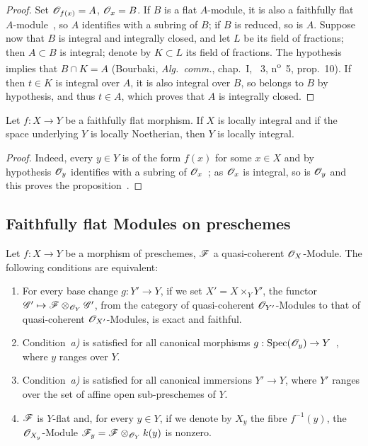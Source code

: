\begin{proof}
Set $\mathscr{O}_{f(x)}=A$, $\mathscr{O}_x=B$.
If $B$ is a flat $A$-module, it is also a faithfully flat $A$-module~, so $A$ identifies with a subring of $B$; if $B$ is reduced, so is $A$.
Suppose now that $B$ is integral and integrally closed, and let $L$ be its field of fractions; then $A\subset B$ is integral; denote by $K\subset L$ its field of fractions.
The hypothesis implies that $B\cap K=A$ (Bourbaki, \emph{Alg.~comm.}, chap.~I, \textsection~3, n\textsuperscript{o}~5, prop.~10).
If then $t\in K$ is integral over $A$, it is also integral over $B$, so belongs to $B$ by hypothesis, and thus $t\in A$, which proves that $A$ is integrally closed.
\end{proof}

\begin{proposition}[2.1.14]
\label{IV.2.1.14}
Let $f:X\to Y$ be a faithfully flat morphism. If $X$ is locally integral and if the space underlying $Y$ is locally Noetherian, then $Y$ is locally integral.
\end{proposition}

\begin{proof}
Indeed, every $y\in Y$ is of the form $f(x)$ for some $x\in X$ and by hypothesis $\mathscr{O}_y$ identifies with a subring of $\mathscr{O}_x$~; as $\mathscr{O}_x$ is integral, so is $\mathscr{O}_y$ and this proves the proposition~.
\end{proof}

\subsection{Faithfully flat Modules on preschemes}
\label{subsection:IV.2.2}

\begin{proposition}[2.2.1]
\label{IV.2.2.1}
Let $f:X\to Y$ be a morphism of preschemes, $\mathscr{F}$ a quasi-coherent $\mathscr{O}_X$-Module. The following conditions are equivalent:
\begin{enumerate}
  \item[\emph{a)}] For every base change $g:Y'\to Y$, if we set $X'=X\times_Y Y'$, the functor $\mathscr{G}'\mapsto\mathscr{F}\otimes_{\mathscr{O}_Y}\mathscr{G}'$, from the category of quasi-coherent $\mathscr{O}_{Y'}$-Modules to that of quasi-coherent $\mathscr{O}_{X'}$-Modules, is exact and faithful.
  \item[\emph{a$'$)}] Condition~\emph{a)} is satisfied for all canonical morphisms $g:\operatorname{Spec}(\mathscr{O}_y)\to Y$~, where $y$ ranges over $Y$.
  \item[\emph{a$''$)}] Condition~\emph{a)} is satisfied for all canonical immersions $Y'\to Y$, where $Y'$ ranges over the set of affine open sub-preschemes of $Y$.
  \item[\emph{b)}] $\mathscr{F}$ is $Y$-flat and, for every $y\in Y$, if we denote by $X_y$ the fibre $f^{-1}(y)$, the $\mathscr{O}_{X_y}$-Module $\mathscr{F}_y=\mathscr{F}\otimes_{\mathscr{O}_Y}k(y)$ is nonzero.
\end{enumerate}
\end{proposition}

